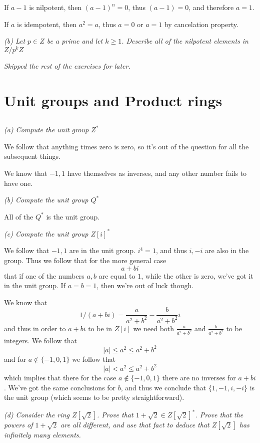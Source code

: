 \documentclass[11pt,oneside,titlepage]{book}
\newcommand{\set}[1]{\{ #1 \}}
\begin{document}
If $a - 1$ is nilpotent, then $(a - 1)^n = 0$, thus $(a - 1) = 0$, and therefore $a = 1$.

If $a$ is idempotent, then $a^2 = a$, thus $a = 0$ or $a = 1$ by
cancelation property.

\textit{(b) Let $p \in Z$ be a prime and let $k \geq 1$. Describe all of the
  nilpotent elements in $Z/p^kZ$}

\textit{Skipped the rest of the exercises for later.}

\section{Unit groups and Product rings}

\subsection{}

\textit{(a) Compute the unit group $Z^*$}

We follow that anything times zero is zero, so it's out of the
question for all the subsequent things.

We know that $-1, 1$ have themselves as inverses, and any other number
fails to have one.

\textit{(b) Compute the unit group $Q^*$}

All of the $Q^*$ is the unit group.

\textit{(c) Compute the unit group $Z[i]^*$}

We follow that $-1, 1$ are in the unit group. $i^4 = 1$, and thus $i,
-i$ are also in the group. Thus we follow that for the more general
case
$$a + bi$$
that if one of the numbers $a, b$ are equal to $1$, while the other is
zero, we've got it in the unit group. If $a = b = 1$, then we're out
of luck though.

We know that
$$1 / (a + bi) = \frac{a}{a^2 + b^2}  - \frac{b}{a^2 + b^2}i$$
and thus in order to $a + bi$ to be in $Z[i]$ we need both
$\frac{a}{a^2 + b^2}$ and $\frac{b}{a^2 + b^2}$ to be integers.
We follow that
$$|a| \leq a^2 \leq a^2 + b^2$$
and for $a \notin \set{-1, 0, 1}$ we follow that
$$|a| < a^2 \leq a^2 + b^2$$
which implies that there for the case $a \notin \set{-1, 0, 1}$ there are
no inverses for $a + bi$. We've got the same conclusions for $b$,
and thus we conclude that $\set{1, -1, i, -i}$ is the unit group
(which seems to be pretty straightforward).

\textit{(d) Consider the ring $Z[\sqrt{2}]$. Prove that $1 + \sqrt{2}
  \in Z[\sqrt{2}]^*$. Prove that the powers of $1 + \sqrt{2}$ are all
  different, and use that fact to deduce that $Z[\sqrt{2}]$ has
  infinitely many elements.}
\end{document}

